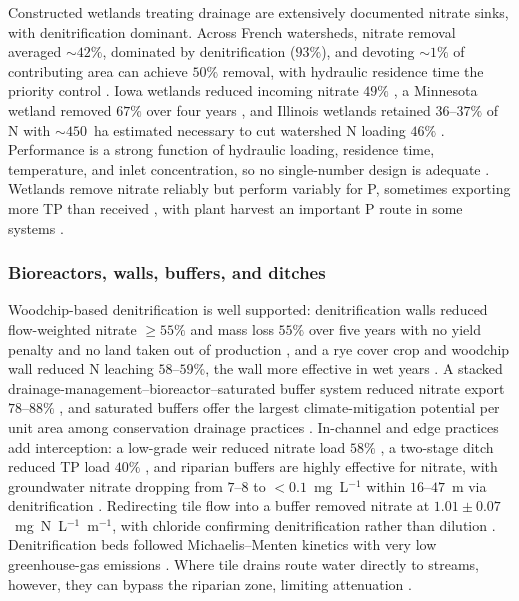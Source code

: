 Constructed wetlands treating drainage are extensively documented nitrate
sinks, with denitrification dominant. Across French watersheds, nitrate
removal averaged $\sim42\%$, dominated by denitrification ($93\%$), and
devoting $\sim1\%$ of contributing area can achieve $50\%$ removal, with
hydraulic residence time the priority control \parencite{Tournebize2017}.
Iowa wetlands reduced incoming nitrate $49\%$ \parencite{Drake2018}, a
Minnesota wetland removed $67\%$ over four years \parencite{Gordon2021}, and
Illinois wetlands retained $36$--$37\%$ of N with $\sim450$~ha estimated
necessary to cut watershed N loading $46\%$ \parencite{Kovacic2006}.
Performance is a strong function of hydraulic loading, residence time,
temperature, and inlet concentration, so no single-number design is adequate
\parencite{Kadlec2012,Steidl2019}. Wetlands remove nitrate reliably but
perform variably for P, sometimes exporting more TP than received
\parencite{Tanner2005,Tanner2011,Messer2021}, with plant harvest an important
P route in some systems \parencite{Lenhart2016}.

\subsubsection{Bioreactors, walls, buffers, and ditches}

Woodchip-based denitrification is well supported: denitrification walls
reduced flow-weighted nitrate $\geq55\%$ and mass loss $55\%$ over five years
with no yield penalty and no land taken out of production
\parencite{Jaynes2008}, and a rye cover crop and woodchip wall reduced N
leaching $58$--$59\%$, the wall more effective in wet years
\parencite{Rogovska2023}. A stacked drainage-management--bioreactor--saturated
buffer system reduced nitrate export $78$--$88\%$ \parencite{Singh2024b}, and
saturated buffers offer the largest climate-mitigation potential per unit area
among conservation drainage practices \parencite{Hall2025}. In-channel and
edge practices add interception: a low-grade weir reduced nitrate load $58\%$
\parencite{Strock2025b}, a two-stage ditch reduced TP load $40\%$
\parencite{Hodaj2017}, and riparian buffers are highly effective for nitrate,
with groundwater nitrate dropping from $7$--$8$ to $<0.1$~mg~L$^{-1}$ within
$16$--$47$~m via denitrification \parencite{JACOBS1985,Schilling2022}.
Redirecting tile flow into a buffer removed nitrate at
$1.01\pm0.07$~mg~N~L$^{-1}$~m$^{-1}$, with chloride confirming denitrification
rather than dilution \parencite{Jaynes2014,Carstensen2021}. Denitrification
beds followed Michaelis--Menten kinetics with very low greenhouse-gas
emissions \parencite{Ghane2015}. Where tile drains route water directly to
streams, however, they can bypass the riparian zone, limiting attenuation
\parencite{Puckett2005}.

